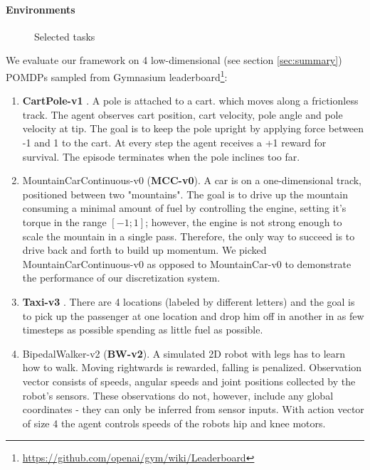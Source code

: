\paragraph{Environments}
\label{sec:envs}

\begin{figure}
    \centering
    \caption{Selected tasks}
    \label{fig:envs}
\end{figure}

We evaluate our framework on 4 low-dimensional (see section \ref{sec:summary}) POMDPs sampled from Gymnasium \cite{towersGymnasiumStandardInterface2024} leaderboard\footnote{\url{https://github.com/openai/gym/wiki/Leaderboard}}:

\begin{enumerate}
\item \textbf{CartPole-v1} \cite{cartpole}.
A pole is attached to a cart.  which moves along a frictionless track.
The agent observes cart position, cart velocity, pole angle and pole velocity at tip.
The goal is to keep the pole upright by applying force between -1 and 1 to the cart.
At every step the agent receives a +1 reward for survival.
The episode terminates when the pole inclines too far.
\item MountainCarContinuous-v0 (\textbf{MCC-v0})\cite{mountain_car}.
A car is on a one-dimensional track, positioned between two "mountains". 
The goal is to drive up the mountain consuming a minimal amount of fuel by controlling the engine, setting it's torque in the range $[-1;1]$; however, the engine is not strong enough to scale the mountain in a single pass.
Therefore, the only way to succeed is to drive back and forth to build up momentum. 
We picked MountainCarContinuous-v0 as opposed to MountainCar-v0 to demonstrate the performance of our discretization system.
\item \textbf{Taxi-v3} \cite{taxi}. There are 4 locations (labeled by different letters) and the goal is to pick up the passenger at one location and drop him off in another in as few timesteps as possible spending as little fuel as possible.
\item BipedalWalker-v2 (\textbf{BW-v2}). A simulated 2D robot with legs has to learn how to walk. 
Moving rightwards is rewarded, falling is penalized.
Observation vector consists of speeds, angular speeds and joint positions collected by the robot's sensors.
These observations do not, however, include any global coordinates - they can only be inferred from sensor inputs.
With action vector of size 4 the agent controls speeds of the robots hip and knee motors.
\end{enumerate}

